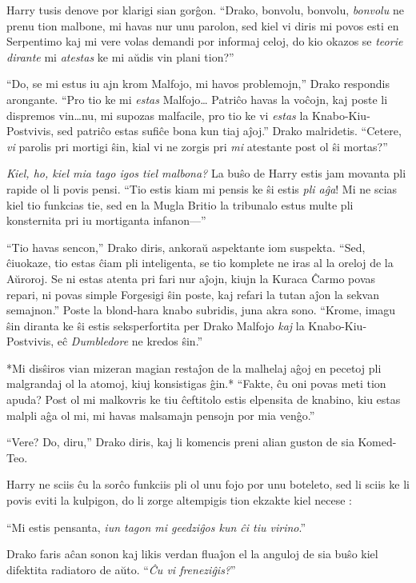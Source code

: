 Harry tusis denove por klarigi sian gorĝon. ``Drako, bonvolu, bonvolu,
\emph{bonvolu} ne prenu tion malbone, mi havas nur unu parolon, sed
kiel vi diris mi povos esti en Serpentimo kaj mi vere volas demandi
por informaj celoj, do kio okazos se \emph{teorie dirante} mi
\emph{atestas} ke mi aŭdis vin plani tion?''

``Do, se mi estus iu ajn krom Malfojo, mi havos problemojn,'' Drako
respondis arongante. ``Pro tio ke mi \emph{estas} Malfojo\ldots
Patriĉo havas la voĉojn, kaj poste li dispremos vin\ldots nu, mi
supozas malfacile, pro tio ke vi \emph{estas} la Knabo-Kiu-Postvivis,
sed patriĉo estas sufiĉe bona kun tiaj aĵoj.'' Drako
malridetis. ``Cetere, \emph{vi} parolis pri mortigi ŝin, kial vi ne
zorgis pri \emph{mi} atestante post ol ŝi mortas?''

\emph{Kiel, ho, kiel mia tago igos tiel malbona?} La buŝo de Harry
estis jam movanta pli rapide ol li povis pensi. ``Tio estis kiam mi
pensis ke ŝi estis \emph{pli aĝa}! Mi ne scias kiel tio funkcias tie,
sed en la Mugla Britio la tribunalo estus multe pli konsternita pri iu
mortiganta infanon—''

``Tio havas sencon,'' Drako diris, ankoraŭ aspektante iom
suspekta. ``Sed, ĉiuokaze, tio estas ĉiam pli inteligenta, se tio
komplete ne iras al la oreloj de la Aŭroroj. Se ni estas atenta pri
fari nur aĵojn, kiujn la Kuraca Ĉarmo povas repari, ni povas simple
Forgesigi ŝin poste, kaj refari la tutan aĵon la sekvan semajnon.''
Poste la blond-hara knabo subridis, juna akra sono. ``Krome, imagu
ŝin diranta ke ŝi estis seksperfortita per Drako Malfojo \emph{kaj} la
Knabo-Kiu-Postvivis, eĉ \emph{Dumbledore} ne kredos ŝin.''


*Mi disŝiros vian mizeran magian restaĵon de la malhelaj aĝoj en
pecetoj pli malgrandaj ol la atomoj, kiuj konsistigas ĝin.* ``Fakte,
ĉu oni povas meti tion apuda? Post ol mi malkovris ke tiu ĉeftitolo
estis elpensita de knabino, kiu estas malpli aĝa ol mi, mi havas
malsamajn pensojn por mia venĝo.''

``Vere? Do, diru,'' Drako diris, kaj li komencis preni alian guston de
sia Komed-Teo.

Harry ne sciis ĉu la sorĉo funkciis pli ol unu fojo por unu boteleto,
sed li sciis ke li povis eviti la kulpigon, do li zorge altempigis
tion ekzakte kiel necese :

``Mi estis pensanta, \emph{iun tagon mi geedziĝos kun ĉi tiu
  virino}.''

Drako faris aĉan sonon kaj likis verdan fluaĵon el la anguloj de sia
buŝo kiel difektita radiatoro de aŭto. ``\emph{Ĉu vi freneziĝis?}''

